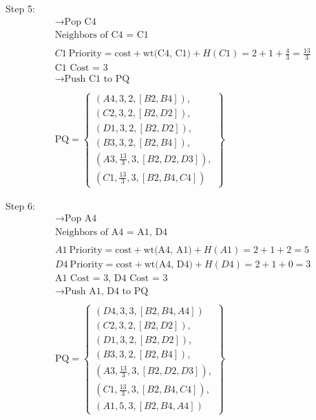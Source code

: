 \documentclass[a4paper]{article}
\begin{document}
\begin{sloppypar}
\begin{enumerate}[start=6,label=Q\arabic*,left=0pt]
    \par Step 5:
    \begin{align*}
        &\rightarrow \text{Pop C4} \\
        &\text{Neighbors of C4 = C1} \\\\
        &C1 \: \text{Priority} = \text{cost} + \text{wt(C4, C1)} + H(C1) = 2 + 1 + \frac{4}{3} = \frac{13}{3} \\
        &\text{C1 Cost = 3} \\
        &\rightarrow \text{Push C1 to PQ} \\\\
        &\text{PQ} = \left\{\begin{array}{l}
            (A4, 3, 2, [B2, B4]), \\
            (C2, 3, 2, [B2, D2]), \\
            (D1, 3, 2, [B2, D2]), \\
            (B3, 3, 2, [B2, B4]), \\
            (A3, \frac{13}{3}, 3, [B2, D2, D3]), \\
            (C1, \frac{13}{3}, 3, [B2, B4, C4])
        \end{array}\right\}
    \end{align*}

    \par Step 6:
    \begin{align*}
        &\rightarrow \text{Pop A4} \\
        &\text{Neighbors of A4 = A1, D4} \\\\
        &A1 \: \text{Priority} = \text{cost} + \text{wt(A4, A1)} + H(A1) = 2 + 1 + 2 = 5 \\
        &D4 \: \text{Priority} = \text{cost} + \text{wt(A4, D4)} + H(D4) = 2 + 1 + 0 = 3 \\
        &\text{A1 Cost = 3, D4 Cost = 3} \\
        &\rightarrow \text{Push A1, D4 to PQ} \\\\
        &\text{PQ} = \left\{\begin{array}{l}
            (D4, 3, 3, [B2, B4, A4]) \\
            (C2, 3, 2, [B2, D2]), \\
            (D1, 3, 2, [B2, D2]), \\
            (B3, 3, 2, [B2, B4]), \\
            (A3, \frac{13}{3}, 3, [B2, D2, D3]), \\
            (C1, \frac{13}{3}, 3, [B2, B4, C4]), \\
            (A1, 5, 3, [B2, B4, A4])
        \end{array}\right\}
    \end{align*}


\end{enumerate}
\end{sloppypar}
\end{document}
